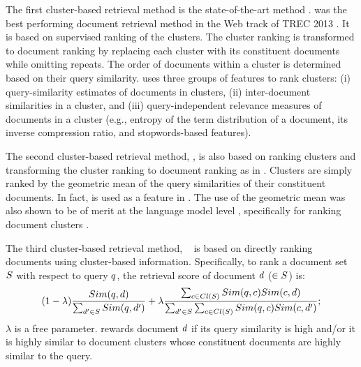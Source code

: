 The first cluster-based retrieval method is the state-of-the-art \clustMRF method
\cite{Raiber+Kurland:13a}. \clustMRF was the best performing document retrieval method in
the Web track of TREC 2013 \cite{Thompson+al:13a}. It is based on supervised ranking of the clusters. The cluster ranking is transformed to document ranking by replacing each cluster with its constituent documents while omitting repeats. The order of documents within a cluster is determined based on their query similarity. \clustMRF uses three groups of features to rank clusters: (i) query-similarity estimates of documents in clusters, (ii) inter-document similarities in a cluster, and (iii) query-independent relevance measures of documents in a cluster (e.g., entropy of the term distribution of a document, its inverse compression ratio, and stopwords-based features).


The second cluster-based retrieval method, \geoClust \cite{Kurland+Krikon:11a}, is also based on ranking clusters and transforming the cluster ranking to document ranking as in \clustMRF \cite{Raiber+Kurland:13a}. Clusters are simply ranked by the geometric mean of the query similarities of their constituent documents. In fact, \geoClust is used as a feature in \clustMRF. The use of the geometric mean was also shown to be of merit at the language model level \cite{Seo+Croft:10a}, specifically for ranking document clusters \cite{Liu+Croft:08a}.


The third cluster-based retrieval method,
\interp~\cite{Kurland:09a}
is based on
directly ranking documents using cluster-based
information. Specifically, to rank a document set $S$ with respect to query $q$, the
retrieval score of document $d$ ($\in S$) is:
\begin{equation}
 \label{eq:interpf}
(1-\lambda)
\frac{Sim(q,d)}{\sum_{d' \in S}
  Sim(q,d')} + 
\lambda 
\frac{\sum_{c \in Cl(S)}Sim(q,c)Sim(c,d)}{\sum_{d' \in S}\sum_{c \in Cl(S)}Sim(q,c)Sim(c,d')}  ; \notag
\end{equation}
$\lambda$ is a free parameter.
\interp rewards document $d$ if its query similarity is high and/or it is highly similar to document clusters whose constituent documents are highly similar to the query.



